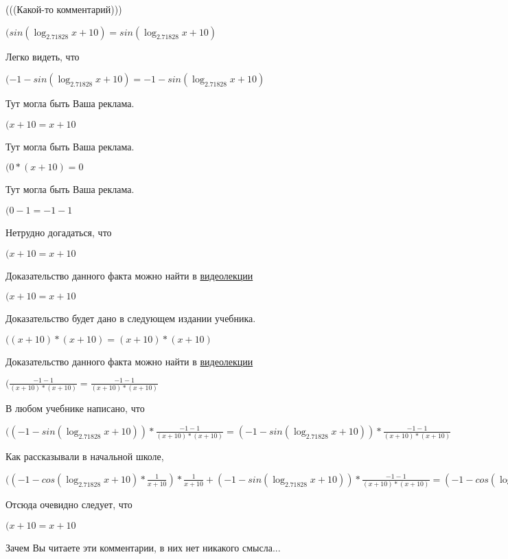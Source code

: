 \documentclass[12pt,a4paper,fleqn]{article}
\theoremstyle{definition}
\begin{document}
(((Какой-то комментарий)))

$(sin(\log_{ 2.71828 }{ x  +  10 }) = sin(\log_{ 2.71828 }{ x  +  10 })$

Легко видеть, что

$( -1  - sin(\log_{ 2.71828 }{ x  +  10 }) =  -1  - sin(\log_{ 2.71828 }{ x  +  10 })$

Тут могла быть Ваша реклама.

$( x  +  10  =  x  +  10 $

Тут могла быть Ваша реклама.

$( 0  * ( x  +  10 ) =  0 $

Тут могла быть Ваша реклама.

$( 0  -  1  =  -1  -  1 $

Нетрудно догадаться, что

$( x  +  10  =  x  +  10 $

Доказательство данного факта можно найти в \href{https://www.youtube.com/watch?v=dQw4w9WgXcQ}{видеолекции}

$( x  +  10  =  x  +  10 $

Доказательство будет дано в следующем издании учебника.

$(( x  +  10 ) * ( x  +  10 ) = ( x  +  10 ) * ( x  +  10 )$

Доказательство данного факта можно найти в \href{https://www.youtube.com/watch?v=dQw4w9WgXcQ}{видеолекции}

$(\frac{ -1  -  1 }{( x  +  10 ) * ( x  +  10 )}
 = \frac{ -1  -  1 }{( x  +  10 ) * ( x  +  10 )}
$

В любом учебнике написано, что

$(( -1  - sin(\log_{ 2.71828 }{ x  +  10 })) * \frac{ -1  -  1 }{( x  +  10 ) * ( x  +  10 )}
 = ( -1  - sin(\log_{ 2.71828 }{ x  +  10 })) * \frac{ -1  -  1 }{( x  +  10 ) * ( x  +  10 )}
$

Как рассказывали в начальной школе,

$(( -1  - cos(\log_{ 2.71828 }{ x  +  10 }) * \frac{ 1 }{ x  +  10 }
) * \frac{ 1 }{ x  +  10 }
 + ( -1  - sin(\log_{ 2.71828 }{ x  +  10 })) * \frac{ -1  -  1 }{( x  +  10 ) * ( x  +  10 )}
 = ( -1  - cos(\log_{ 2.71828 }{ x  +  10 }) * \frac{ 1 }{ x  +  10 }
) * \frac{ 1 }{ x  +  10 }
 + ( -1  - sin(\log_{ 2.71828 }{ x  +  10 })) * \frac{ -1  -  1 }{( x  +  10 ) * ( x  +  10 )}
$

Отсюда очевидно следует, что

$( x  +  10  =  x  +  10 $

Зачем Вы читаете эти комментарии, в них нет никакого смысла...
\end{document}
